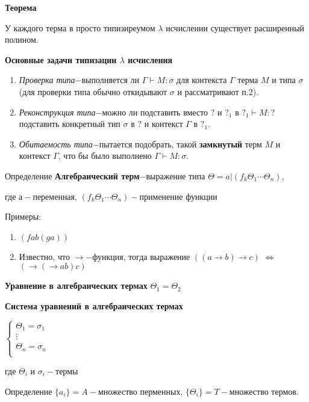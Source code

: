 \documentclass[12pt, a4paper]{article}
\begin{document}
	\par \textbf{Теорема}\par 
		У каждого терма в просто типизиреумом $\lambda$ исчислении существует расширенный полином.\par	
	\textbf{Основные задачи типизации $\lambda$ исчисления}\par
		\begin{enumerate}
			\item \emph{Проверка типа$-$}выполняется ли $\Gamma\vdash M:\sigma$ для контекста $\Gamma\text{ терма }M\text{ и типа }\sigma$ (для проверки типа обычно откидывают $\sigma$ и рассматривают п.2).
			\item \emph{Реконструкция типа$-$}можно ли подставить вместо $?$ и $?_1$ в $?_1\vdash M:?$ подставить конкретный тип $\sigma$ в $?$ и контекст $\Gamma$ в $?_1$.
			\item \emph{Обитаемость типа$-$}пытается подобрать, такой \textbf{замкнутый} терм $M$ и контекст $\Gamma$, что бы было выполнено $\Gamma\vdash M:\sigma$.
		\end{enumerate}			
	\par Определение \textbf{Алгебраический терм}$-$выражение типа $\Theta=a|(f_k \Theta_1\dotsb\Theta_n)$, \par где $а-$переменная, $(f_k \Theta_1\dotsb\Theta_n)-$применение функции\par
	Примеры:
	\begin{enumerate}
	\item $(f a b ( g a))$ 
	\item Известно, что $\to-$функция, тогда выражение $((a\to b)\to c)$ $\Longleftrightarrow$ $(\to (\to a b) c)$
\end{enumerate}		
	\par \textbf{Уравнение в алгебраических термах} $\Theta_1=\Theta_2$\par
	\par \textbf{Система уравнений в алгебраических термах}\par
	$		
		\begin{cases}			
			\Theta_1=\sigma_1&\\
			\vdots&\\
			\Theta_n=\sigma_n&\\
		\end{cases}
	$\par где $\Theta_i \text{ и } \sigma_i-\text{термы}$\par
	\par Определение $\{a_i\}=A-$множество перменных, $\{\Theta_i\}=T-$множество термов.\par
\end{document}
